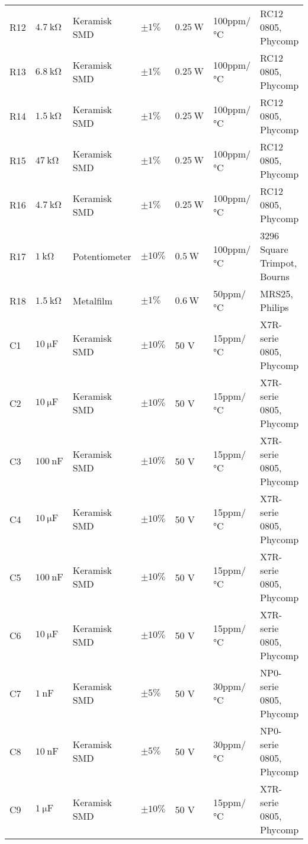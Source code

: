 \begin{table}[h!]
\begin{threeparttable}
\begin{tabular}{ l l l l l l l }
R12 & $\SI{4.7}{\kilo\ohm}$		& Keramisk	SMD	& $\pm 1\%$ 		 & $\SI{0.25}{\watt}$	  & 100ppm/\si{\celsius}  & RC12 0805, Phycomp \\
R13 & $\SI{6.8}{\kilo\ohm}$		& Keramisk	SMD	& $\pm 1\%$ 		 & $\SI{0.25}{\watt}$	  & 100ppm/\si{\celsius}  & RC12 0805, Phycomp \\
R14 & $\SI{1.5}{\kilo\ohm}$		& Keramisk	SMD	& $\pm 1\%$ 		 & $\SI{0.25}{\watt}$	  & 100ppm/\si{\celsius}  & RC12 0805, Phycomp \\
R15 & $\SI{47}{\kilo\ohm}$		& Keramisk	SMD	& $\pm 1\%$ 		 & $\SI{0.25}{\watt}$	  & 100ppm/\si{\celsius}  & RC12 0805, Phycomp \\
R16 & $\SI{4.7}{\kilo\ohm}$		& Keramisk	SMD	& $\pm 1\%$ 		 & $\SI{0.25}{\watt}$	  & 100ppm/\si{\celsius}  & RC12 0805, Phycomp \\
R17 & $\SI{1}{\kilo\ohm}$		& Potentiometer		& $\pm 10\%$ 		 & $\SI{0.5}{\watt}$	  & 100ppm/\si{\celsius}  & 3296 Square Trimpot, Bourns  \\
R18 & $\SI{1.5}{\kilo\ohm}$		& Metalfilm	& $\pm 1\%$ 		 & $\SI{0.6}{\watt}$	  & 50ppm/\si{\celsius}  & MRS25, Philips \\
C1 & $\SI{10}{\micro\farad}$ & Keramisk SMD & $\pm 10\%$ & 50 \si{\volt}  & 15ppm/\si{\celsius} & X7R-serie 0805, Phycomp \\
C2 & $\SI{10}{\micro\farad}$ & Keramisk SMD & $\pm 10\%$ & 50 \si{\volt} & 15ppm/\si{\celsius} & X7R-serie 0805, Phycomp \\
C3 & $\SI{100}{\nano\farad}$ & Keramisk SMD & $\pm 10\%$ & 50 \si{\volt} & 15ppm/\si{\celsius} & X7R-serie 0805, Phycomp \\
C4 & $\SI{10}{\micro\farad}$ & Keramisk SMD & $\pm 10\%$ & 50 \si{\volt} & 15ppm/\si{\celsius} & X7R-serie 0805, Phycomp \\
C5 & $\SI{100}{\nano\farad}$ & Keramisk SMD & $\pm 10\%$ & 50 \si{\volt} & 15ppm/\si{\celsius} & X7R-serie 0805, Phycomp \\
C6 & $\SI{10}{\micro\farad}$ & Keramisk SMD & $\pm 10\%$ & 50 \si{\volt} & 15ppm/\si{\celsius} & X7R-serie 0805, Phycomp \\
C7 & $\SI{1}{\nano\farad}$ & Keramisk SMD & $\pm 5\%$ & 50 \si{\volt} & 30ppm/\si{\celsius} & NP0-serie 0805, Phycomp \\
C8 & $\SI{10}{\nano\farad}$ & Keramisk SMD & $\pm 5\%$ & 50 \si{\volt} & 30ppm/\si{\celsius} & NP0-serie 0805, Phycomp \\
C9 & $\SI{1}{\micro\farad}$ & Keramisk SMD & $\pm 10\%$ & 50 \si{\volt} & 15ppm/\si{\celsius} & X7R-serie 0805, Phycomp \\

\end{tabular}
\end{threeparttable}
\end{table}
